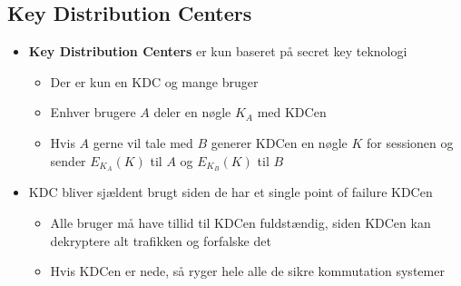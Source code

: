 \documentclass[a4, english]{article}
\begin{document}
\subsection{Key Distribution Centers}
\begin{itemize}
	\item \textbf{Key Distribution Centers} er kun baseret på secret key teknologi 
  \begin{itemize}
  	\item Der er kun en KDC og mange bruger 
    \item Enhver brugere $A$ deler en nøgle $K_A$ med KDCen 
    \item Hvis $A$ gerne vil tale med $B$ generer KDCen en nøgle $K$ for sessionen og sender $E_{K_A}(K)$ til $A$ og $E_{K_B}(K)$ til $B$
  \end{itemize}
  \item KDC bliver sjældent brugt siden de har et single point of failure KDCen
  \begin{itemize}
  	\item Alle bruger må have tillid til KDCen fuldstændig, siden KDCen kan dekryptere alt trafikken og forfalske det  
    \item Hvis KDCen er nede, så ryger hele alle de sikre kommutation systemer   
  \end{itemize}
\end{itemize}
\end{document}

